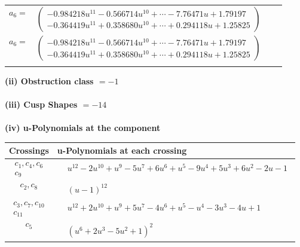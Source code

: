 \documentclass[1p]{elsarticle_modified}
\theoremstyle{definition}
\begin{document}
\begin{tabular}{m{7pt} m{180pt} m{7pt} m{180pt} }
\flushright $a_{6}=$&$\begin{pmatrix}-0.984218 u^{11}-0.566714 u^{10}+\cdots-7.76471 u+1.79197\\-0.364419 u^{11}+0.358680 u^{10}+\cdots+0.294118 u+1.25825\end{pmatrix}$\\ \flushright $a_{6}=$&$\begin{pmatrix}-0.984218 u^{11}-0.566714 u^{10}+\cdots-7.76471 u+1.79197\\-0.364419 u^{11}+0.358680 u^{10}+\cdots+0.294118 u+1.25825\end{pmatrix}$\\&\end{tabular}
\flushleft \textbf{(ii) Obstruction class $= -1$}\\~\\
\flushleft \textbf{(iii) Cusp Shapes $= -14$}\\~\\
\newpage\renewcommand{\arraystretch}{1}
\flushleft \textbf{(iv) u-Polynomials at the component}\newline \\
\begin{tabular}{m{50pt}|m{274pt}}
Crossings & \hspace{64pt}u-Polynomials at each crossing \\
\hline $$\begin{aligned}c_{1},c_{4},c_{6}\\c_{9}\end{aligned}$$&$\begin{aligned}
&u^{12}-2 u^{10}+u^9-5 u^7+6 u^6+u^5-9 u^4+5 u^3+6 u^2-2 u-1
\end{aligned}$\\
\hline $$\begin{aligned}c_{2},c_{8}\end{aligned}$$&$\begin{aligned}
&(u-1)^{12}
\end{aligned}$\\
\hline $$\begin{aligned}c_{3},c_{7},c_{10}\\c_{11}\end{aligned}$$&$\begin{aligned}
&u^{12}+2 u^{10}+u^9+5 u^7-4 u^6+u^5- u^4-3 u^3-4 u+1
\end{aligned}$\\
\hline $$\begin{aligned}c_{5}\end{aligned}$$&$\begin{aligned}
&(u^6+2 u^3-5 u^2+1)^2
\end{aligned}$\\
\hline
\end{tabular}\\~\\
\end{document}
